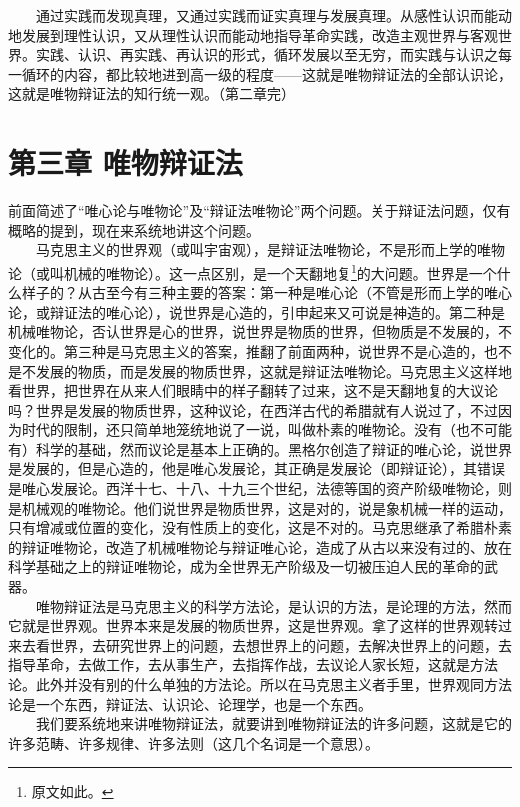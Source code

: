 \documentclass[cn,11pt,chinese]{elegantbook}
\def\myformat#1{\hfil\hfil #1}
\begin{document}
　　通过实践而发现真理，又通过实践而证实真理与发展真理。从感性认识而能动地发展到理性认识，又从理性认识而能动地指导革命实践，改造主观世界与客观世界。实践、认识、再实践、再认识的形式，循环发展以至无穷，而实践与认识之每一循环的内容，都比较地进到高一级的程度——这就是唯物辩证法的全部认识论，这就是唯物辩证法的知行统一观。（第二章完）\\
\newpage\section*{\myformat{第三章  唯物辩证法}}
前面简述了“唯心论与唯物论”及“辩证法唯物论”两个问题。关于辩证法问题，仅有概略的提到，现在来系统地讲这个问题。\\
　　马克思主义的世界观（或叫宇宙观），是辩证法唯物论，不是形而上学的唯物论（或叫机械的唯物论）。这一点区别，是一个天翻地复\footnote[1]{ 原文如此。}的大问题。世界是一个什么样子的？从古至今有三种主要的答案：第一种是唯心论（不管是形而上学的唯心论，或辩证法的唯心论），说世界是心造的，引申起来又可说是神造的。第二种是机械唯物论，否认世界是心的世界，说世界是物质的世界，但物质是不发展的，不变化的。第三种是马克思主义的答案，推翻了前面两种，说世界不是心造的，也不是不发展的物质，而是发展的物质世界，这就是辩证法唯物论。马克思主义这样地看世界，把世界在从来人们眼睛中的样子翻转了过来，这不是天翻地复的大议论吗？世界是发展的物质世界，这种议论，在西洋古代的希腊就有人说过了，不过因为时代的限制，还只简单地笼统地说了一说，叫做朴素的唯物论。没有（也不可能有）科学的基础，然而议论是基本上正确的。黑格尔创造了辩证的唯心论，说世界是发展的，但是心造的，他是唯心发展论，其正确是发展论（即辩证论），其错误是唯心发展论。西洋十七、十八、十九三个世纪，法德等国的资产阶级唯物论，则是机械观的唯物论。他们说世界是物质世界，这是对的，说是象机械一样的运动，只有增减或位置的变化，没有性质上的变化，这是不对的。马克思继承了希腊朴素的辩证唯物论，改造了机械唯物论与辩证唯心论，造成了从古以来没有过的、放在科学基础之上的辩证唯物论，成为全世界无产阶级及一切被压迫人民的革命的武器。\\
　　唯物辩证法是马克思主义的科学方法论，是认识的方法，是论理的方法，然而它就是世界观。世界本来是发展的物质世界，这是世界观。拿了这样的世界观转过来去看世界，去研究世界上的问题，去想世界上的问题，去解决世界上的问题，去指导革命，去做工作，去从事生产，去指挥作战，去议论人家长短，这就是方法论。此外并没有别的什么单独的方法论。所以在马克思主义者手里，世界观同方法论是一个东西，辩证法、认识论、论理学，也是一个东西。\\
　　我们要系统地来讲唯物辩证法，就要讲到唯物辩证法的许多问题，这就是它的许多范畴、许多规律、许多法则（这几个名词是一个意思）。 \\
\end{document}
